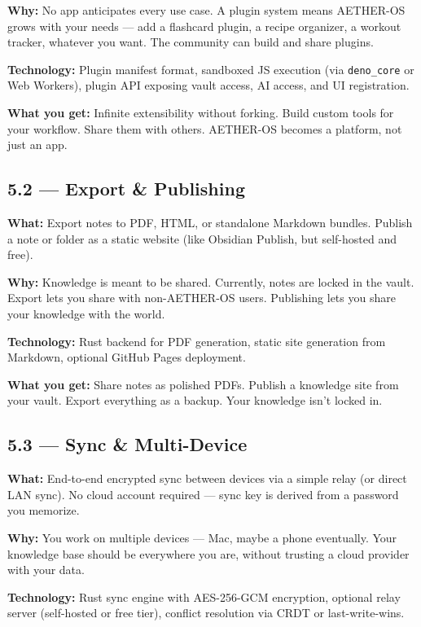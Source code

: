 \documentclass[11pt,a4paper]{article}
\begin{document}
\textbf{Why:} No app anticipates every use case. A plugin system means AETHER-OS grows with your needs --- add a flashcard plugin, a recipe organizer, a workout tracker, whatever you want. The community can build and share plugins.

\textbf{Technology:} Plugin manifest format, sandboxed JS execution (via \texttt{deno\_core} or Web Workers), plugin API exposing vault access, AI access, and UI registration.

\textbf{What you get:} Infinite extensibility without forking. Build custom tools for your workflow. Share them with others. AETHER-OS becomes a platform, not just an app.

\subsection{5.2 --- Export \& Publishing}

\textbf{What:} Export notes to PDF, HTML, or standalone Markdown bundles. Publish a note or folder as a static website (like Obsidian Publish, but self-hosted and free).

\textbf{Why:} Knowledge is meant to be shared. Currently, notes are locked in the vault. Export lets you share with non-AETHER-OS users. Publishing lets you share your knowledge with the world.

\textbf{Technology:} Rust backend for PDF generation, static site generation from Markdown, optional GitHub Pages deployment.

\textbf{What you get:} Share notes as polished PDFs. Publish a knowledge site from your vault. Export everything as a backup. Your knowledge isn't locked in.

\subsection{5.3 --- Sync \& Multi-Device}

\textbf{What:} End-to-end encrypted sync between devices via a simple relay (or direct LAN sync). No cloud account required --- sync key is derived from a password you memorize.

\textbf{Why:} You work on multiple devices --- Mac, maybe a phone eventually. Your knowledge base should be everywhere you are, without trusting a cloud provider with your data.

\textbf{Technology:} Rust sync engine with AES-256-GCM encryption, optional relay server (self-hosted or free tier), conflict resolution via CRDT or last-write-wins.
\end{document}
